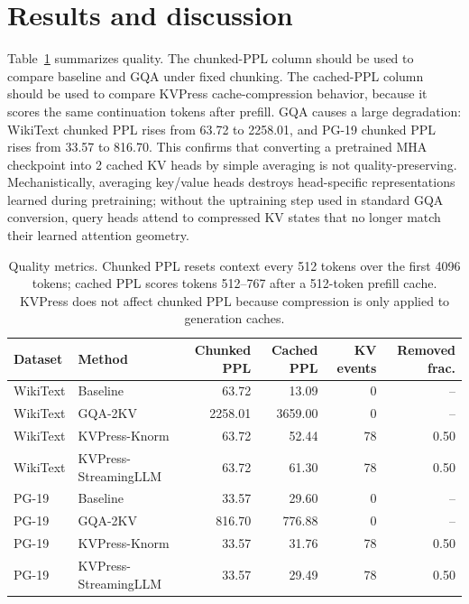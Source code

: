 \documentclass{article}
\begin{document}
\section{Results and discussion}

Table~\ref{tab:quality} summarizes quality. The chunked-PPL column should be used to compare baseline and GQA under fixed chunking. The cached-PPL column should be used to compare KVPress cache-compression behavior, because it scores the same continuation tokens after prefill. GQA causes a large degradation: WikiText chunked PPL rises from 63.72 to 2258.01, and PG-19 chunked PPL rises from 33.57 to 816.70. This confirms that converting a pretrained MHA checkpoint into 2 cached KV heads by simple averaging is not quality-preserving. Mechanistically, averaging key/value heads destroys head-specific representations learned during pretraining; without the uptraining step used in standard GQA conversion, query heads attend to compressed KV states that no longer match their learned attention geometry.

\begin{table}[!htbp]
  \caption{Quality metrics. Chunked PPL resets context every 512 tokens over the first 4096 tokens; cached PPL scores tokens 512--767 after a 512-token prefill cache. KVPress does not affect chunked PPL because compression is only applied to generation caches.}
  \label{tab:quality}
  \centering
  \small
  \setlength{\tabcolsep}{4pt}
  \begin{tabular}{llrrrr}
    \toprule
    Dataset & Method & Chunked PPL & Cached PPL & KV events & Removed frac. \\
    \midrule
    WikiText & Baseline & 63.72 & 13.09 & 0 & -- \\
    WikiText & GQA-2KV & 2258.01 & 3659.00 & 0 & -- \\
    WikiText & KVPress-Knorm & 63.72 & 52.44 & 78 & 0.50 \\
    WikiText & KVPress-StreamingLLM & 63.72 & 61.30 & 78 & 0.50 \\
    PG-19 & Baseline & 33.57 & 29.60 & 0 & -- \\
    PG-19 & GQA-2KV & 816.70 & 776.88 & 0 & -- \\
    PG-19 & KVPress-Knorm & 33.57 & 31.76 & 78 & 0.50 \\
    PG-19 & KVPress-StreamingLLM & 33.57 & 29.49 & 78 & 0.50 \\
    \bottomrule
  \end{tabular}
\end{table}
\end{document}
